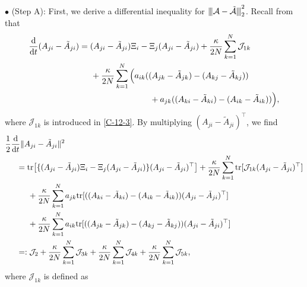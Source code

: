 \documentclass[11pt,reqno]{amsart}
\numberwithin{figure}{section}
\newcommand{\opnorm}[1]{{ \vert\kern-0.25ex \vert\kern-0.25ex \vert #1 
     \vert\kern-0.25ex \vert\kern-0.25ex \vert}}
\newcommand{\kp}{\kappa}
\newcommand{\dd}{  {\textup{d}} }
\begin{document}
\noindent $\bullet$ (Step A): First, we derive a differential inequality for $\opnorm{\mathcal A - \tilde{\mathcal A}}_2^2$. Recall from \cite[Appendix A]{HKK21} that
\begin{align} \label{C-12-2}
\begin{aligned}
\frac{\dd}{\dd t} (A_{ji} - \tilde A_{ji}) &= (A_{ji} - \tilde A_{ji})\Xi_i - \Xi_j(A_{ji} - \tilde A_{ji} ) + \frac{\kp}{2N} \sum_{k=1}^N \mathcal J_{1k} \\
&\hspace{0.5cm}+\frac{\kp}{2N} \sum_{k=1}^N \Big(a_{ik}(( A_{jk} - \tilde A_{jk}) - (A_{kj} - \tilde A_{kj}))  \\
&\hspace{3cm}+ a_{jk}(( A_{ki} - \tilde  A_{ki}) - (A_{ik} - \tilde A_{ik})) \Big),
\end{aligned}
\end{align}
where $\mathcal J_{1k}$ is introduced in \eqref{C-12-3}. By multiplying $(A_{ji} - \tilde A_{ji})^\top$, we find
 \begin{align} \label{C-13}
\begin{aligned}
 &\frac12\frac{\dd}{\dd t} \|A_{ji} - \tilde A_{ji}\|^2  \\
 &\hspace{0.5cm}= \textup{tr} \big[ \{ (A_{ji} - \tilde A_{ji})\Xi_i - \Xi_j(A_{ji} - \tilde A_{ji} ) \}       (A_{ji} - \tilde A_{ji})^\top  \big] + \frac{\kp}{2N} \sum_{k=1}^N \textup{tr}[ \mathcal J_{1k}     (A_{ji} - \tilde A_{ji})^\top    ]  \\
 &\hspace{1cm}+ \frac{\kp}{2N} \sum_{k=1}^N a_{jk} \textup{tr}[ ( ( A_{ki} - \tilde A_{ki}) - (A_{ik} - \tilde A_{ik})    )   (A_{ji} - \tilde A_{ji})^\top ] \\
 &\hspace{1cm}+ \frac{\kp}{2N} \sum_{k=1}^N a_{ik}\textup{tr}[ ( ( A_{jk} - \tilde A_{jk}) - (A_{kj} - \tilde A_{kj})    )   (A_{ji} - \tilde A_{ji})^\top ]  \\
 &\hspace{0.5cm} = : \mathcal J_2 + \frac{\kp}{2N} \sum_{k=1}^N \mathcal J_{3k} + \frac{\kp}{2N} \sum_{k=1}^N \mathcal J_{4k} + \frac{\kp}{2N} \sum_{k=1}^N \mathcal J_{5k},
\end{aligned}
\end{align}
where $\mathcal J_{1k}$ is defined as 
\end{document}
